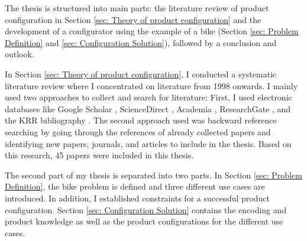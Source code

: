 The thesis is structured into main parts: the literature review of product configuration in Section \ref{sec: Theory of product configuration} and the development of a configurator using the example of a bike (Section \ref{sec: Problem Definition} and \ref{sec: Configuration Solution}), followed by a conclusion and outlook. \newline

In Section \ref{sec: Theory of product configuration}, I conducted a systematic literature review where I concentrated on literature from 1998 onwards. 
I mainly used two approaches to collect and search for literature: First, I used electronic databases like Google Scholar \cite{GoogleScholar}, ScienceDirect \cite{ScienceDirect}, Academia \cite{Academia}, ResearchGate \cite{ResearchGate}, and the KRR bibliography \cite{KRR}.
The second approach used was backward reference searching by going through the references of already collected papers and identifying new papers, journals, and articles to include in the thesis. Based on this research, 45 papers were included in this thesis. \newline

The second part of my thesis is separated into two parts.
In Section \ref{sec: Problem Definition}, the bike problem is defined and three different use cases are introduced. 
In addition, I established constraints for a successful product configuration. 
Section \ref{sec: Configuration Solution} contains the encoding and product knowledge as well as the product configurations for the different use cases. 